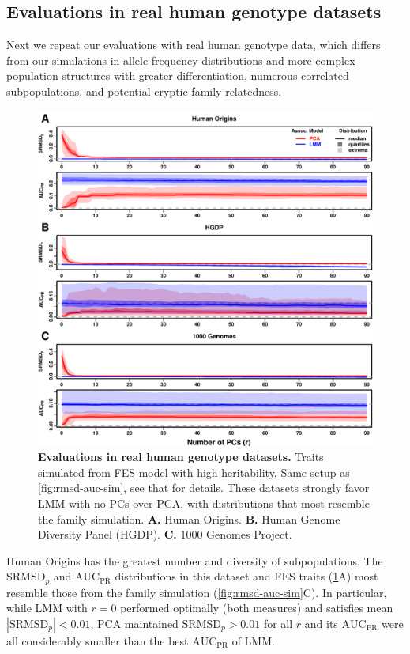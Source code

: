 \documentclass[11pt]{article}
\newcommand{\rmsd}{\text{SRMSD}_p}
\newcommand{\auc}{\text{AUC}_\text{PR}}
\begin{document}
\begin{linenumbers}
\subsection{Evaluations in real human genotype datasets}

Next we repeat our evaluations with real human genotype data, which differs from our simulations in allele frequency distributions and more complex population structures with greater differentiation, numerous correlated subpopulations, and potential cryptic family relatedness.

\begin{figure}[hp]
  \centering
  \includegraphics[width=\textwidth,height=\textheight,keepaspectratio]{fes/rmsd-auc-real.pdf}
  \caption{
    {\bf Evaluations in real human genotype datasets.}
    Traits simulated from FES model with high heritability.
    Same setup as \cref{fig:rmsd-auc-sim}, see that for details.
    These datasets strongly favor LMM with no PCs over PCA, with distributions that most resemble the family simulation.
    \textbf{A.}
    Human Origins.
    \textbf{B.}
    Human Genome Diversity Panel (HGDP).
    \textbf{C.}
    1000 Genomes Project.
  }
  \label{fig:rmsd-auc-real}
\end{figure}

Human Origins has the greatest number and diversity of subpopulations.
The $\rmsd$ and $\auc$ distributions in this dataset and FES traits (\cref{fig:rmsd-auc-real}A) most resemble those from the family simulation (\cref{fig:rmsd-auc-sim}C).
In particular, while LMM with $r=0$ performed optimally (both measures) and satisfies mean $|\rmsd| < 0.01$, PCA maintained $\rmsd > 0.01$ for all $r$ and its $\auc$ were all considerably smaller than the best $\auc$ of LMM.


\end{linenumbers}
\end{document}
